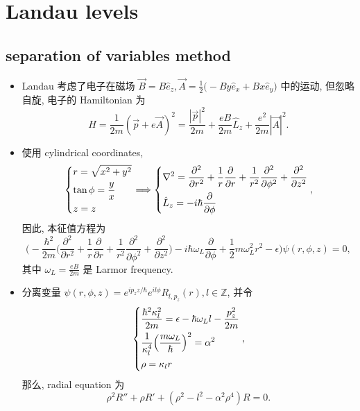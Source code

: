 \chapter{Landau levels} \label{A}
\section{separation of variables method}
\begin{itemize}
	\item Landau 考虑了电子在磁场 $\vec{B} = B \hat{e}_z, \vec{A} = \frac{1}{2} \big( - B y \hat{e}_x + B x \hat{e}_y \big)$ 中的运动, 但忽略自旋, 电子的 Hamiltonian 为
	\begin{equation}
		H = \frac{1}{2 m} (\vec{p} + e \vec{A})^2 = \frac{|\vec{p}|^2}{2 m} + \frac{e B}{2 m} \hat{L}_z + \frac{e^2}{2 m} |\vec{A}|^2.
	\end{equation}
	
	\item 使用 cylindrical coordinates,
	\begin{equation}
		\begin{dcases}
			r = \sqrt{x^2 + y^2} \\
			\tan \phi = \frac{y}{x} \\
			z = z
		\end{dcases} \Longrightarrow \begin{dcases}
			\nabla^2 = \frac{\partial^2}{\partial r^2} + \frac{1}{r} \frac{\partial}{\partial r} + \frac{1}{r^2} \frac{\partial^2}{\partial \phi^2} + \frac{\partial^2}{\partial z^2} \\
			\hat{L}_z = - i \hbar \frac{\partial}{\partial \phi}
		\end{dcases},
	\end{equation}
	因此, 本征值方程为
	\begin{equation}
		\Big( - \frac{\hbar^2}{2 m} \Big( \frac{\partial^2}{\partial r^2} + \frac{1}{r} \frac{\partial}{\partial r} + \frac{1}{r^2} \frac{\partial^2}{\partial \phi^2} + \frac{\partial^2}{\partial z^2} \Big) - i \hbar \omega_L \frac{\partial}{\partial \phi} + \frac{1}{2} m \omega_L^2 r^2 - \epsilon \Big) \psi(r, \phi, z) = 0,
	\end{equation}
	其中 $\omega_L = \frac{e B}{2 m}$	是 Larmor frequency.
	
	\item 分离变量 $\psi(r, \phi, z) = e^{i p_z z / \hbar} e^{i l \phi} R_{l, p_z}(r), l \in \mathbb{Z}$, 并令
	\begin{equation}
		\begin{dcases}
			\frac{\hbar^2 \kappa_l^2}{2 m} = \epsilon - \hbar \omega_L l - \frac{p_z^2}{2 m} \\
			\frac{1}{\kappa_l^4} \Big( \frac{m \omega_L}{\hbar} \Big)^2 = \alpha^2 \\
			\rho = \kappa_l r \\
		\end{dcases},
	\end{equation}
	那么, radial equation 为
	\begin{equation}
		\rho^2 R'' + \rho R' + (\rho^2 - l^2 - \alpha^2 \rho^4) R = 0.
	\end{equation}
\end{itemize}

